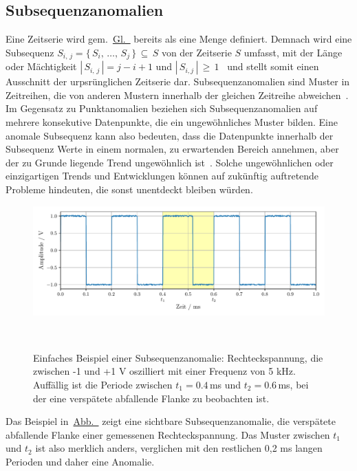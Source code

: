 \subsection{Subsequenzanomalien}

Eine Zeitserie wird gem.~\hyperref[eq:timeseries_set]{Gl.~} bereits als eine Menge definiert. Demnach wird eine
Subsequenz $S_{i,\,j} = \{\,S_i,\,\dots,\,S_j\,\}\,\subseteq\,S$ von der Zeitserie $S$ umfasst, mit der Länge oder Mächtigkeit
$|\,S_{i,\,j}\,|=j-i+1$ und $|\,S_{i,j}\,|\,\ge\,1$~\cite{Schmidl2022} und stellt somit einen Ausschnitt der urpsrünglichen Zeitserie
dar. Subsequenz\-anomalien sind Muster in Zeitreihen, die von anderen Mustern innerhalb der gleichen Zeitreihe
abweichen~\cite{Chandola2009}\Cite[S.~12]{Wenig2024}. Im Gegensatz zu Punktanomalien beziehen sich Subsequenz\-ano\-malien auf mehrere
konsekutive Datenpunkte, die ein ungewöhnliches Muster bilden. Eine anomale Subsequenz kann also bedeuten, dass die Datenpunkte innerhalb
der Subsequenz Werte in einem normalen, zu erwartenden Bereich annehmen, aber der zu Grunde liegende Trend ungewöhnlich
ist~\cite{Chandola2009}\cite[S.~17]{Boniol2021}. Solche ungewöhnlichen oder einzigartigen Trends und Entwicklungen können auf zukünftig
auftretende Probleme hindeuten, die sonst unentdeckt bleiben würden.

\begin{figure}[H]
    \centering
    \includegraphics[width=\linewidth]{ch4_anomalien/abbildungen/subsequenz_anomalie.pdf}
    \caption{\centering Einfaches Beispiel einer Subsequenzanomalie: Rechteckspannung, die zwischen -1 und +1 V oszilliert mit einer
    Frequenz von 5 kHz. Auffällig ist die Periode zwischen $t_1=0.4\,$ms und $t_2=0.6\,$ms, bei der eine verspätete abfallende Flanke zu
    beobachten ist.}
~\label{fig:subsequenz_rect}
\end{figure}

Das Beispiel in~\hyperref[fig:subsequenz_rect]{Abb.~} zeigt eine sichtbare Subsequenzanomalie, die verspätete
abfallende Flanke einer gemessenen Rechteckspannung. Das Muster zwischen $t_1$ und $t_2$ ist also merklich anders, verglichen mit den
restlichen 0,2 ms langen Perioden und daher eine Anomalie.


